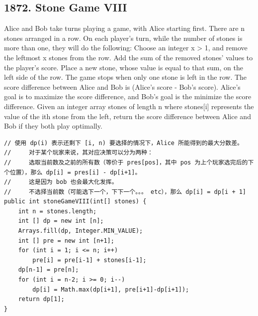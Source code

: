 \documentclass[9pt, b5paper]{article}
\begin{document}
\subsection{1872. Stone Game VIII}
\label{sec-4-24}
Alice and Bob take turns playing a game, with Alice starting first.
There are n stones arranged in a row. On each player's turn, while the number of stones is more than one, they will do the following:
Choose an integer x > 1, and remove the leftmost x stones from the row.
Add the sum of the removed stones' values to the player's score.
Place a new stone, whose value is equal to that sum, on the left side of the row.
The game stops when only one stone is left in the row.
The score difference between Alice and Bob is (Alice's score - Bob's score). Alice's goal is to maximize the score difference, and Bob's goal is the minimize the score difference.
Given an integer array stones of length n where stones[i] represents the value of the ith stone from the left, return the score difference between Alice and Bob if they both play optimally.
\begin{verbatim}
// 使用 dp(i) 表示还剩下 [i, n) 要选择的情况下，Alice 所能得到的最大分数差。
//     对于某个玩家来说，其对应决策可以分为两种：
//     选取当前数及之前的所有数（等价于 pres[pos]，其中 pos 为上个玩家选完后的下个位置），那么 dp[i] = pres[i] - dp[i+1]。
//     这是因为 bob 也会最大化发挥。
//     不选择当前数（可能选下一个，下下一个。。。 etc），那么 dp[i] = dp[i + 1]
public int stoneGameVIII(int[] stones) {
    int n = stones.length;
    int [] dp = new int [n];
    Arrays.fill(dp, Integer.MIN_VALUE);
    int [] pre = new int [n+1];
    for (int i = 1; i <= n; i++)
        pre[i] = pre[i-1] + stones[i-1];
    dp[n-1] = pre[n];
    for (int i = n-2; i >= 0; i--) 
        dp[i] = Math.max(dp[i+1], pre[i+1]-dp[i+1]);
    return dp[1];
}
\end{verbatim}
\end{document}

